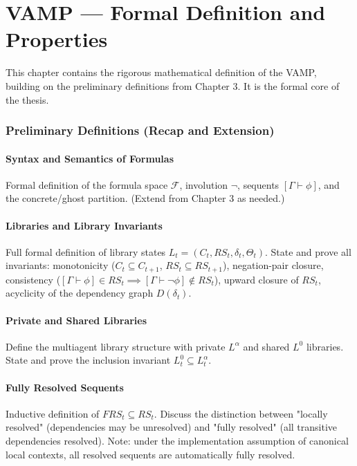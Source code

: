 \chapter{VAMP --- Formal Definition and Properties}\label{chap:vamp}

This chapter contains the rigorous mathematical definition of the VAMP, building on the preliminary definitions from Chapter 3. It is the formal core of the thesis.

\subsection{Preliminary Definitions (Recap and Extension)}

\subsubsection{Syntax and Semantics of Formulas}
Formal definition of the formula space $\mathcal{F}$, involution $\neg$, sequents $[\Gamma \vdash \phi]$, and the concrete/ghost partition. (Extend from Chapter 3 as needed.)

\subsubsection{Libraries and Library Invariants}
Full formal definition of library states $L_t = (C_t, RS_t, \delta_t, \Theta_t)$. State and prove all invariants: monotonicity ($C_t \subseteq C_{t+1}$, $RS_t \subseteq RS_{t+1}$), negation-pair closure, consistency ($[\Gamma \vdash \phi] \in RS_t \implies [\Gamma \vdash \neg\phi] \notin RS_t$), upward closure of $RS_t$, acyclicity of the dependency graph $D(\delta_t)$.

\subsubsection{Private and Shared Libraries}
Define the multiagent library structure with private $L^\alpha$ and shared $L^0$ libraries. State and prove the inclusion invariant $L^0_t \subseteq L^\alpha_t$.

\subsubsection{Fully Resolved Sequents}
Inductive definition of $FRS_t \subseteq RS_t$. Discuss the distinction between "locally resolved" (dependencies may be unresolved) and "fully resolved" (all transitive dependencies resolved). Note: under the implementation assumption of canonical local contexts, all resolved sequents are automatically fully resolved.

